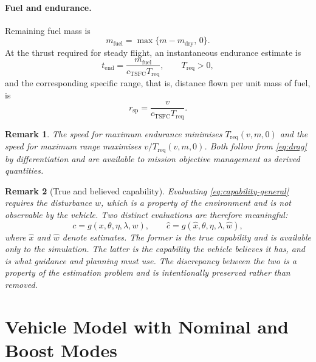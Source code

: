 \documentclass[11pt,a4paper]{article}
\newtheorem{remark}{Remark}
\newcommand{\vecx}{x}
\newcommand{\vecw}{w}
\newcommand{\vecc}{c}
\newcommand{\vectheta}{\theta}
\newcommand{\veceta}{\eta}
\newcommand{\veclambda}{\lambda}
\newcommand{\vecg}{g}
\begin{document}
\paragraph{Fuel and endurance.}
Remaining fuel mass is
\begin{equation}
  m_{\mathrm{fuel}} = \max\{m - m_{\mathrm{dry}},\, 0\} .
\end{equation}
At the thrust required for steady flight, an instantaneous endurance estimate is
\begin{equation}
  t_{\mathrm{end}} = \frac{m_{\mathrm{fuel}}}{c_{\mathrm{TSFC}} T_{\mathrm{req}}},
  \qquad T_{\mathrm{req}} > 0,
  \label{eq:endurance}
\end{equation}
and the corresponding specific range, that is, distance flown per unit mass of
fuel, is
\begin{equation}
  r_{\mathrm{sp}} = \frac{v}{c_{\mathrm{TSFC}} T_{\mathrm{req}}} .
  \label{eq:specific-range}
\end{equation}

\begin{remark}
The speed for maximum endurance minimises $T_{\mathrm{req}}(v,m,0)$ and the
speed for maximum range maximises $v / T_{\mathrm{req}}(v,m,0)$. Both follow from
\cref{eq:drag} by differentiation and are available to mission objective
management as derived quantities.
\end{remark}

\begin{remark}[True and believed capability]
\label{rem:true-believed}
Evaluating \cref{eq:capability-general} requires the disturbance $\vecw$, which
is a property of the environment and is not observable by the vehicle. Two
distinct evaluations are therefore meaningful:
\begin{equation}
  \vecc = \vecg(\vecx, \vectheta, \veceta, \veclambda, \vecw),
  \qquad
  \hat{\vecc} = \vecg(\hat{\vecx}, \vectheta, \veceta, \veclambda, \hat{\vecw}),
\end{equation}
where $\hat{\vecx}$ and $\hat{\vecw}$ denote estimates. The former is the true
capability and is available only to the simulation. The latter is the capability
the vehicle believes it has, and is what guidance and planning must use. The
discrepancy between the two is a property of the estimation problem and is
intentionally preserved rather than removed.
\end{remark}

\section{Vehicle Model with Nominal and Boost Modes}
\end{document}
